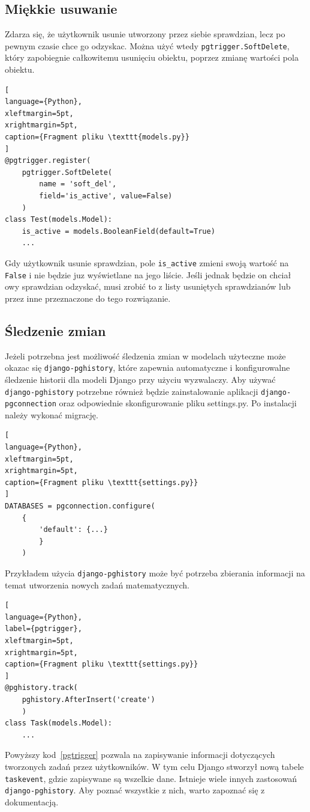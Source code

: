 \documentclass[oneside,polski,logo,indent]{amuthesis}
\begin{document}
\begin{center}
\subsection{Miękkie usuwanie}
\end{center}
Zdarza się, że użytkownik usunie utworzony przez siebie sprawdzian, lecz po pewnym czasie chce go odzyskac. Można użyć wtedy \texttt{pgtrigger.SoftDelete}, który zapobiegnie całkowitemu usunięciu obiektu, poprzez zmianę wartości pola obiektu.
\begin{lstlisting}[
language={Python},
xleftmargin=5pt,
xrightmargin=5pt,
caption={Fragment pliku \texttt{models.py}}
]
@pgtrigger.register(
    pgtrigger.SoftDelete(
        name = 'soft_del',
	    field='is_active', value=False)
    )
class Test(models.Model):
    is_active = models.BooleanField(default=True)
    ... 
\end{lstlisting}
Gdy użytkownik usunie sprawdzian, pole \texttt{is\_active} zmieni swoją wartość na \texttt{False} i nie będzie juz wyświetlane na jego liście. Jeśli jednak będzie on chciał owy sprawdzian odzyskać, musi zrobić to z listy usuniętych sprawdzianów lub przez inne przeznaczone do tego rozwiązanie.
\begin{center}
\subsection{Śledzenie zmian}
\end{center}

Jeżeli potrzebna jest możliwość śledzenia zmian w modelach użyteczne może okazac się \texttt{django-pghistory}, które zapewnia automatyczne i konfigurowalne śledzenie historii dla modeli Django przy użyciu wyzwalaczy. Aby używać \texttt{django-pghistory} potrzebne również będzie zainstalowanie aplikacji \texttt{django-pgconnection} oraz odpowiednie skonfigurowanie pliku settings.py. Po instalacji należy wykonać migrację.
\begin{lstlisting}[
language={Python},
xleftmargin=5pt,
xrightmargin=5pt,
caption={Fragment pliku \texttt{settings.py}}
]
DATABASES = pgconnection.configure(
    {
        'default': {...}
        }
    )
\end{lstlisting}
Przykładem użycia \texttt{django-pghistory} może być potrzeba zbierania informacji na temat utworzenia nowych zadań matematycznych.
\begin{lstlisting}[
language={Python},
label={pgtrigger},
xleftmargin=5pt,
xrightmargin=5pt,
caption={Fragment pliku \texttt{settings.py}}
]
@pghistory.track(
    pghistory.AfterInsert('create')
    )
class Task(models.Model):
	...
\end{lstlisting}
Powyższy kod~\ref{pgtrigger} pozwala na zapisywanie informacji dotyczących tworzonych zadań przez użytkowników. W tym celu Django stworzył nową tabele \texttt{taskevent}, gdzie zapisywane są wszelkie dane.
Istnieje wiele innych zastosowań \texttt{django-pghistory}. Aby poznać wszystkie z nich, warto zapoznać się z dokumentacją.
\end{document}
